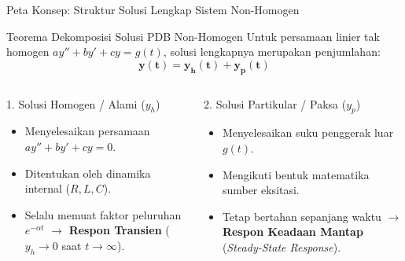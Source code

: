\documentclass[aspectratio=169,10pt]{beamer}
\begin{document}
\begin{frame}{Peta Konsep: Struktur Solusi Lengkap Sistem Non-Homogen}
  \begin{block}{Teorema Dekomposisi Solusi PDB Non-Homogen}
    Untuk persamaan linier tak homogen $a y'' + b y' + c y = g(t)$, solusi lengkapnya merupakan penjumlahan:
    \begin{equation}
      \mathbf{y(t) = y_h(t) + y_p(t)}
    \end{equation}
  \end{block}
  \vspace{0.1cm}
  \begin{columns}[t]
    \begin{exampleblock}{1. Solusi Homogen / Alami ($y_h$)}
      \begin{itemize}
        \item Menyelesaikan persamaan $a y'' + b y' + c y = 0$.
        \item Ditentukan oleh dinamika internal ($R, L, C$).
        \item Selalu memuat faktor peluruhan $e^{-\alpha t}$ $\rightarrow$ \textbf{Respon Transien} ($y_h \to 0$ saat $t \to \infty$).
      \end{itemize}
    \end{exampleblock}

    \begin{alertblock}{2. Solusi Partikular / Paksa ($y_p$)}
      \begin{itemize}
        \item Menyelesaikan suku penggerak luar $g(t)$.
        \item Mengikuti bentuk matematika sumber eksitasi.
        \item Tetap bertahan sepanjang waktu $\rightarrow$ \textbf{Respon Keadaan Mantap} (\textit{Steady-State Response}).
      \end{itemize}
    \end{alertblock}
  \end{columns}
\end{frame}
\end{document}

